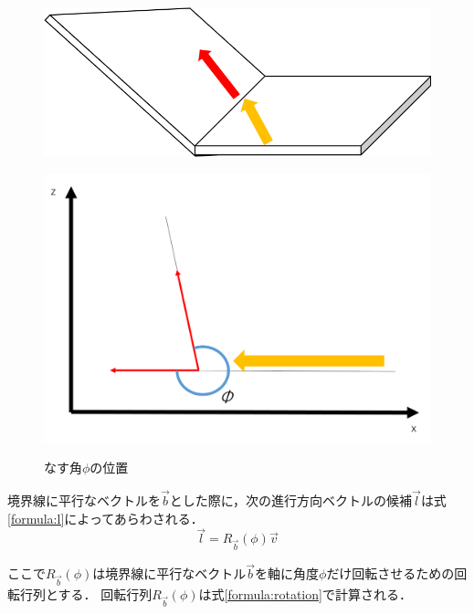 \documentclass[a4paper,11pt]{jarticle}
\begin{document}
	\begin{figure}
		\begin{minipage}{0.5\linewidth}
			\centering
			\includegraphics[width=1\linewidth]{png/sub.png}
			\label{fig:phi}
		\end{minipage}
		\begin{minipage}{0.5\linewidth}
			\centering
			\includegraphics[width=1\linewidth]{png/rotation.png}
			\label{fig:xz}
		\end{minipage}
		\caption{なす角$\phi$の位置}
		\label{fig:rotation}
	\end{figure}
	
	境界線に平行なベクトルを$\vec{b} $とした際に，次の進行方向ベクトルの候補$\vec{l}$は式\ref{formula:l}によってあらわされる．
	\begin{equation}
	\label{formula:l}
	\vec{l} = R_{\vec{b}}(\phi)\vec{v}
	\end{equation}
	
	ここで$R_{\vec{b}}(\phi)$は境界線に平行なベクトル$\vec{b}$を軸に角度$\phi$だけ回転させるための回転行列とする．
	回転行列$R_{\vec{b}}(\phi)$は式\ref{formula:rotation}で計算される．
	
\end{document}
